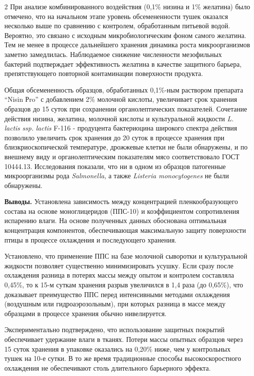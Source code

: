 \begin{multicols}{2}
При анализе комбинированного воздействия (0,1\% низина и 1\% желатина)
было отмечено, что на начальном этапе уровень обсемененности тушек
оказался несколько выше по сравнению с контролем, обработанным питьевой
водой. Вероятно, это связано с исходным микробиологическим фоном самого
желатина. Тем не менее в процессе дальнейшего хранения динамика роста
микроорганизмов заметно замедлилась. Наблюдаемое снижение численности
мезофильных бактерий подтверждает эффективность желатина в качестве
защитного барьера, препятствующего повторной контаминации поверхности
продукта.

Общая обсемененность образцов, обработанных 0,1\%-ным раствором
препарата ``Nisin Рro'' с добавлением 2\% молочной кислоты, увеличивает
срок хранения образцов до 15 суток при сохранении органолептических
показателей. Сочетание действия низина, желатина, молочной кислоты и
культуральной жидкости \emph{L. lactis ssp.} \emph{lactis} F-116 -
продуцента бактериоцина широкого спектра действия позволило увеличить
срок хранения до 20 суток в процессе хранения при близкриоскопической
температуре, дрожжевые клетки не были обнаружены, и по внешнему виду и
органолептическим показателям мясо соответствовало ГОСТ 10444.13.
Исследования показали, что ни в одном из образцов патогенные
микроорганизмы рода \emph{Salmonella}, а также \emph{Listeria
monocytogenes} не были обнаружены.

{\bfseries Выводы.} Установлена зависимость между концентрацией
пленкообразующего состава на основе моноглицеридов (ППС-10) и
коэффициентом сопротивления испарению влаги. На основе полученных данных
обоснована оптимальная концентрация компонентов, обеспечивающая
максимальную защиту поверхности птицы в процессе охлаждения и
последующего хранения.

Установлено, что применение ППС на базе молочной сыворотки и
культуральной жидкости позволяет существенно минимизировать усушку. Если
сразу после охлаждения разница в потерях массы между опытом и контролем
составляла 0,45\%, то к 15-м суткам хранения разрыв увеличился в 1,4
раза (до 0,65\%), что доказывает преимущество ППС перед интенсивными
методами охлаждения (воздушным или гидроаэрозольным), при которых
разница в массе между образцами в процессе хранения обычно нивелируется.

Экспериментально подтверждено, что использование защитных покрытий
обеспечивает удержание влаги в тканях. Потери массы опытных образцов
через 15 суток хранения в упаковке оказались на 0,20\% ниже, чем у
контрольных тушек на 10-е сутки. В то же время традиционные способы
высокоскоростного охлаждения не обеспечивают столь длительного
барьерного эффекта.


\end{multicols}
